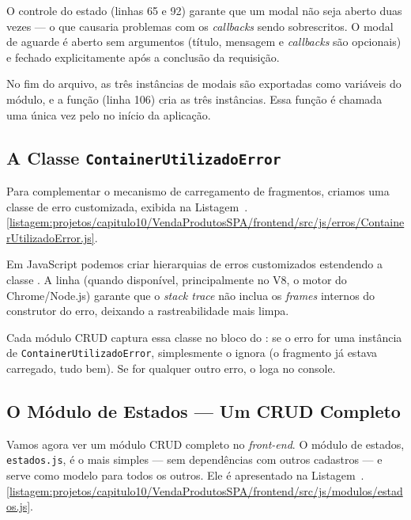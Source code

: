 O controle do estado  (linhas 65 e 92) garante que um modal não seja aberto duas vezes --- o que causaria problemas com os \textit{callbacks} sendo sobrescritos. O modal de aguarde é aberto sem argumentos (título, mensagem e \textit{callbacks} são opcionais) e fechado explicitamente após a conclusão da requisição.

No fim do arquivo, as três instâncias de modais são exportadas como variáveis do módulo, e a função  (linha 106) cria as três instâncias. Essa função é chamada uma única vez pelo  no início da aplicação.


\subsection{A Classe \texttt{ContainerUtilizadoError}}

Para complementar o mecanismo de carregamento de fragmentos, criamos uma classe de erro customizada, exibida na Listagem~\thechapter.\ref{listagem:projetos/capitulo10/VendaProdutosSPA/frontend/src/js/erros/ContainerUtilizadoError.js}.


Em JavaScript podemos criar hierarquias de erros customizados estendendo a classe . A linha  (quando disponível, principalmente no V8, o motor do Chrome/Node.js) garante que o \textit{stack trace} não inclua os \textit{frames} internos do construtor do erro, deixando a rastreabilidade mais limpa.

Cada módulo CRUD captura essa classe no bloco  do : se o erro for uma instância de \texttt{ContainerUtilizadoError}, simplesmente o ignora (o fragmento já estava carregado, tudo bem). Se for qualquer outro erro, o loga no console.


\subsection{O Módulo de Estados --- Um CRUD Completo}

Vamos agora ver um módulo CRUD completo no \textit{front-end}. O módulo de estados, \texttt{estados.js}, é o mais simples --- sem dependências com outros cadastros --- e serve como modelo para todos os outros. Ele é apresentado na Listagem~\thechapter.\ref{listagem:projetos/capitulo10/VendaProdutosSPA/frontend/src/js/modulos/estados.js}.

